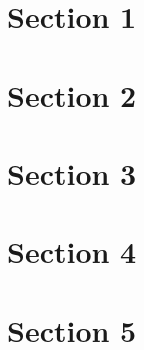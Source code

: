 \documentclass[9pt]{article}
\begin{document}
   \section{Section 1}
      
   \section{Section 2}
      
   \section{Section 3}
      
   \section{Section 4}
      
   \section{Section 5}
      
\end{document}

